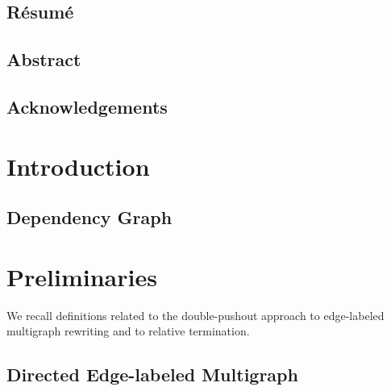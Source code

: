 \documentclass{report}
\begin{document}
  
   
  
 
\newpage  
\section*{Résumé}
  

\newpage
\section*{Abstract}

  
\newpage  
\section*{Acknowledgements} 

\newpage       
  
  
\tableofcontents   
\newpage      

\chapter{Introduction}  

\section{Dependency Graph}

\chapter{Preliminaries}
\label{chap:preliminaries}
We recall definitions related to the double-pushout approach to edge-labeled multigraph rewriting and to relative termination. 
% 
\section{Directed Edge-labeled Multigraph} 
\label{Preliminaries:Graphs}
 
\end{document}
